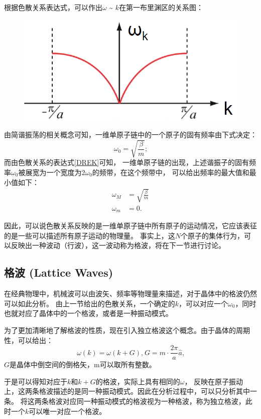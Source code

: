 \documentclass[declarePage]{ecnuthesis}
\begin{document}
根据色散关系表达式，可以作出$\omega$ \~{} $k$在第一布里渊区的关系图：
\begin{figure}[htb]
    \centering
    \includegraphics[width=.5\textwidth]{OmegaK.png}
    \label{OmegaK}
\end{figure}

由简谐振荡的相关概念可知，一维单原子链中的一个原子的固有频率由下式决定：
\begin{equation}
    \omega_0 = \sqrt{\frac{\beta}{m}} \text{;}
\end{equation}
而由色散关系的表达式\ref{DREK}可知，%
一维单原子链的出现，上述谐振子的固有频率$\omega_0$被展宽为一个宽度为$2\omega_0$的频带，在这个频带中，%
可以给出频率的最大值和最小值如下：
\begin{align}
    \omega_M &= \sqrt{\frac{\beta}{m}}\\
    \omega_m &= 0 \text{.}
\end{align}

因此，可以说色散关系反映的是一维单原子链中所有原子的运动情况，它应该表征的是一些可以描述所有原子运动的物理量。%
事实上，这$N$个原子的集体行为，可以反映出一种波动（行波），这一波动称为格波，将在下一节进行讨论。

\subsection{格波 (Lattice Waves)} \label{LW}

在经典物理中，机械波可以由波矢、频率等物理量来描述，对于晶体中的格波仍然可以如此分析。%
由上一节给出的色散关系，一个确定的$k$，可以对应一个$\omega_0$，同时也就对应了晶体中的一个格波，或者是一种振动模式。

为了更加清晰地了解格波的性质，现在引入独立格波这个概念。由于晶体的周期性，可以给出：
\begin{equation}
    \omega(k) = \omega(k+G)\text{,}\ G=m \cdot \frac{2\pi}{a}\hat{a} \text{,}
\end{equation}
$G$是晶体中倒空间的倒格矢，m可以取所有整数。

于是可以得知对应于$k$和$k+G$的格波，实际上具有相同的$\omega$，%
反映在原子振动上，这两条格波描述的是同一种振动模式。因此在分析过程中，可以只分析其中一条。%
将这两条格波对应同一种振动模式的格波视为一种格波，称为独立格波，此时一个$k$可以唯一对应一个格波。
\end{document}
